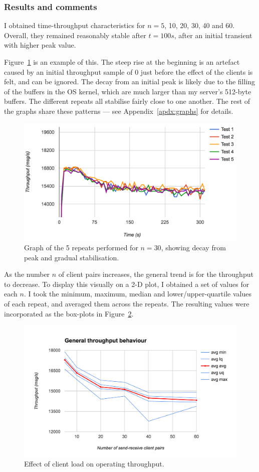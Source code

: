 \subsubsection{Results and comments}
I obtained time-throughput characteristics for $n=5$, 10, 20, 30, 40 and 60. Overall, they remained reasonably stable after $t=100s$, after an initial transient with higher peak value.

Figure~\ref{fig:example-chstic} is an example of this. The steep rise at the beginning is an artefact caused by an initial throughput sample of $0$ just before the effect of the clients is felt, and can be ignored. The decay from an initial peak is likely due to the filling of the buffers in the OS kernel, which are much larger than my server's 512-byte buffers. The different repeats all stabilise fairly close to one another. The rest of the graphs share these patterns --- see Appendix~\ref{apdx:graphs} for details.

\begin{figure}
  \centering\includegraphics[width=\textwidth]{../transcripts/lipsum/30n30/cold.png}
  \caption{Graph of the 5 repeats performed for $n=30$, showing decay from peak and gradual stabilisation.}
  \label{fig:example-chstic}
\end{figure}

As the number $n$ of client pairs increases, the general trend is for the throughput to decrease. To display this visually on a 2-D plot, I obtained a set of values for each $n$. I took the minimum, maximum, median and lower/upper-quartile values of each repeat, and averaged them across the repeats. The resulting values were incorporated as the box-plots in Figure~\ref{fig:summary}.

\begin{figure}
  \centering\includegraphics[width=\textwidth]{../transcripts/lipsum/throughp_clients.png}
  \caption{Effect of client load on operating throughput.}
  \label{fig:summary}
\end{figure}
